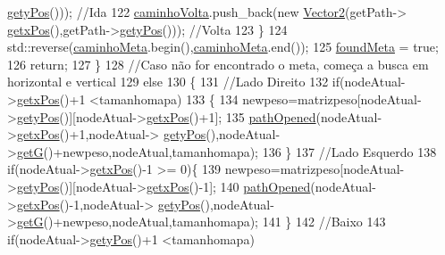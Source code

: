 \begin{DoxyCode}
      \hyperlink{classNode_a7d26325d2355b29184cd6b428a78508b}{getyPos}())); \textcolor{comment}{//Ida}
122             \hyperlink{classBusca__a_a8d0d37ee53d3d9cf4d69a4f6e24f6c8e}{caminhoVolta}.push\_back(\textcolor{keyword}{new} \hyperlink{structVector2}{Vector2}(getPath->
      \hyperlink{classNode_a81aba8cc7d7ebd60051bb7cba210f587}{getxPos}(),getPath->\hyperlink{classNode_a7d26325d2355b29184cd6b428a78508b}{getyPos}())); \textcolor{comment}{//Volta}
123         \}
124         std::reverse(\hyperlink{classBusca__a_ad14fbc1b7c5e830161c6889b7c4c6d3f}{caminhoMeta}.begin(),\hyperlink{classBusca__a_ad14fbc1b7c5e830161c6889b7c4c6d3f}{caminhoMeta}.end());
125         \hyperlink{classBusca__a_a52388dc808f1ea2343e739a3e0025dfd}{foundMeta} = \textcolor{keyword}{true};
126         \textcolor{keywordflow}{return};
127     \}
128     \textcolor{comment}{//Caso não for encontrado o meta, começa a busca em horizontal e vertical}
129     \textcolor{keywordflow}{else}
130     \{
131         \textcolor{comment}{//Lado Direito}
132         \textcolor{keywordflow}{if}(nodeAtual->\hyperlink{classNode_a81aba8cc7d7ebd60051bb7cba210f587}{getxPos}()+1 <tamanhomapa)
133         \{
134             newpeso=matrizpeso[nodeAtual->\hyperlink{classNode_a7d26325d2355b29184cd6b428a78508b}{getyPos}()][nodeAtual->\hyperlink{classNode_a81aba8cc7d7ebd60051bb7cba210f587}{getxPos}()+1];
135             \hyperlink{classBusca__a_a762c5b4a508658689ad8c7b218c6238c}{pathOpened}(nodeAtual->\hyperlink{classNode_a81aba8cc7d7ebd60051bb7cba210f587}{getxPos}()+1,nodeAtual->
      \hyperlink{classNode_a7d26325d2355b29184cd6b428a78508b}{getyPos}(),nodeAtual->\hyperlink{classNode_ab72b743b5abe69381e9066f4225793d2}{getG}()+newpeso,nodeAtual,tamanhomapa);
136         \}
137         \textcolor{comment}{//Lado Esquerdo}
138         \textcolor{keywordflow}{if}(nodeAtual->\hyperlink{classNode_a81aba8cc7d7ebd60051bb7cba210f587}{getxPos}()-1 >= 0)\{
139             newpeso=matrizpeso[nodeAtual->\hyperlink{classNode_a7d26325d2355b29184cd6b428a78508b}{getyPos}()][nodeAtual->\hyperlink{classNode_a81aba8cc7d7ebd60051bb7cba210f587}{getxPos}()-1];
140             \hyperlink{classBusca__a_a762c5b4a508658689ad8c7b218c6238c}{pathOpened}(nodeAtual->\hyperlink{classNode_a81aba8cc7d7ebd60051bb7cba210f587}{getxPos}()-1,nodeAtual->
      \hyperlink{classNode_a7d26325d2355b29184cd6b428a78508b}{getyPos}(),nodeAtual->\hyperlink{classNode_ab72b743b5abe69381e9066f4225793d2}{getG}()+newpeso,nodeAtual,tamanhomapa);
141         \}
142         \textcolor{comment}{//Baixo}
143         \textcolor{keywordflow}{if}(nodeAtual->\hyperlink{classNode_a7d26325d2355b29184cd6b428a78508b}{getyPos}()+1 <tamanhomapa)

\end{DoxyCode}
